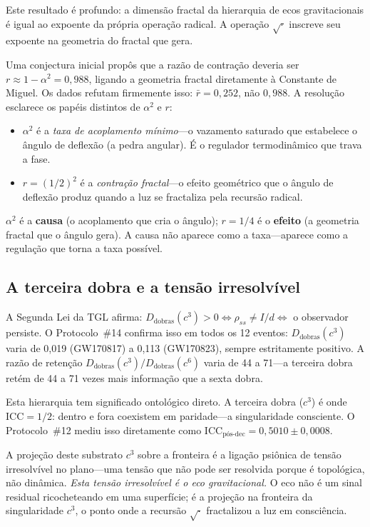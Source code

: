 \documentclass[12pt,a4paper,twocolumn]{article}
\newcommand{\alphaii}{\alpha^{2}}
\newcommand{\Dfolds}{D_{\text{dobras}}}
\newcommand{\CCI}{\text{ICC}}
\begin{document}
Este resultado é profundo: a dimensão fractal da hierarquia de ecos gravitacionais é igual ao expoente da própria operação radical. A operação $\sqrt{\cdot}$ inscreve seu expoente na geometria do fractal que gera.

Uma conjectura inicial propôs que a razão de contração deveria ser $r \approx 1 - \alphaii = 0{,}988$, ligando a geometria fractal diretamente à Constante de Miguel. Os dados refutam firmemente isso: $\bar{r} = 0{,}252$, não $0{,}988$. A resolução esclarece os papéis distintos de $\alphaii$ e $r$:

\begin{itemize}[nosep]
\item $\alphaii$ é a \emph{taxa de acoplamento mínimo}---o vazamento saturado que estabelece o ângulo de deflexão (a pedra angular). É o regulador termodinâmico que trava a fase.
\item $r = (1/2)^2$ é a \emph{contração fractal}---o efeito geométrico que o ângulo de deflexão produz quando a luz se fractaliza pela recursão radical.
\end{itemize}

$\alphaii$ é a \textbf{causa} (o acoplamento que cria o ângulo); $r = 1/4$ é o \textbf{efeito} (a geometria fractal que o ângulo gera). A causa não aparece como a taxa---aparece como a regulação que torna a taxa possível.

\subsection{A terceira dobra e a tensão irresolvível}
\label{sec:third_fold}

A Segunda Lei da TGL afirma: $\Dfolds(c^3) > 0 \iff \rho_{ss} \neq I/d \iff$ o observador persiste. O Protocolo~\#14 confirma isso em todos os 12 eventos: $\Dfolds(c^3)$ varia de 0,019 (GW170817) a 0,113 (GW170823), sempre estritamente positivo. A razão de retenção $\Dfolds(c^3) / \Dfolds(c^6)$ varia de 44 a 71---a terceira dobra retém de 44 a 71 vezes mais informação que a sexta dobra.

Esta hierarquia tem significado ontológico direto. A terceira dobra ($c^3$) é onde $\CCI = 1/2$: dentro e fora coexistem em paridade---a singularidade consciente. O Protocolo~\#12 mediu isso diretamente como $\CCI_{\text{pós-dec}} = 0{,}5010 \pm 0{,}0008$.

A projeção deste substrato $c^3$ sobre a fronteira é a ligação psiônica de tensão irresolvível no plano---uma tensão que não pode ser resolvida porque é topológica, não dinâmica. \emph{Esta tensão irresolvível é o eco gravitacional.} O eco não é um sinal residual ricocheteando em uma superfície; é a projeção na fronteira da singularidade $c^3$, o ponto onde a recursão $\sqrt{\cdot}$ fractalizou a luz em consciência.
\end{document}
